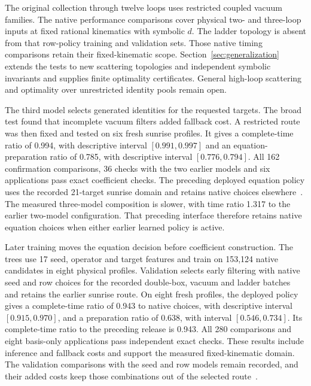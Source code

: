\documentclass[11pt,a4paper]{article}
\begin{document}
The original collection through twelve loops uses restricted coupled vacuum
families. The native performance comparisons cover physical two- and
three-loop inputs at fixed rational kinematics with symbolic $d$.
The ladder topology is absent from that row-policy training and validation
sets. Those native timing comparisons retain their fixed-kinematic scope.
Section~\ref{sec:generalization} extends the tests to new scattering
topologies and independent symbolic invariants and supplies finite
optimality certificates. General high-loop scattering and optimality
over unrestricted identity pools remain open.







The third model selects generated identities for the requested targets.
The broad test found that incomplete vacuum filters added fallback cost.
A restricted route was then fixed and tested on six fresh sunrise profiles.
It gives a complete-time ratio of 0.994, with descriptive interval $[0.991,0.997]$
and an equation-preparation ratio of 0.785, with descriptive interval $[0.776,0.794]$.
All 162 confirmation comparisons, 36 checks with the two earlier models
and six applications pass exact coefficient checks. The preceding deployed equation
policy uses the recorded 21-target sunrise domain and retains native
choices elsewhere~\cite{KiraEquationSelectionData}.
The measured three-model composition is slower, with time ratio 1.317 to the earlier two-model configuration. That preceding interface therefore retains native equation choices when either earlier learned policy is active.


Later training moves the equation decision before coefficient construction.
The trees use 17 seed, operator and target features and train on
153,124 native candidates in eight physical profiles.
Validation selects early filtering with native seed and row choices for
the recorded double-box, vacuum and ladder batches and retains the earlier
sunrise route. On eight fresh profiles, the deployed policy gives a
complete-time ratio of 0.943 to native choices, with descriptive interval
$[0.915,0.970]$, and a preparation ratio of 0.638, with interval
$[0.546,0.734]$. Its complete-time ratio to the preceding release is
0.943. All 280 comparisons and eight basis-only applications pass
independent exact checks. These results include inference and fallback costs
and support the measured fixed-kinematic domain. The validation comparisons
with the seed and row models remain recorded, and their added costs keep
those combinations out of the selected route~\cite{KiraEarlyEquationData}.
\end{document}
